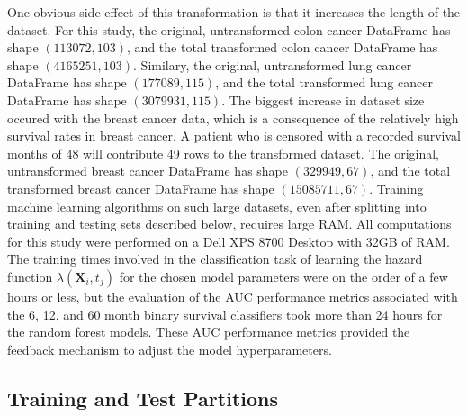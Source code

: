 \documentclass[10pt,letterpaper]{article}
\begin{document}
One obvious side effect of this transformation is that it increases the length of the dataset.
For this study, the original, untransformed colon cancer DataFrame has shape $(113072, 103)$, and the total transformed colon cancer DataFrame has shape $(4165251, 103)$.
Similary, the original, untransformed lung cancer DataFrame has shape $(177089, 115)$, and the total transformed lung cancer DataFrame has shape $(3079931, 115)$.
The biggest increase in dataset size occured with the breast cancer data, which is a consequence of the relatively high survival rates in breast cancer. A patient who is censored with a recorded survival months of 48 will contribute 49 rows to the transformed dataset.  
The original, untransformed breast cancer DataFrame has shape $(329949, 67)$, and the total transformed breast cancer DataFrame has shape $(15085711, 67)$.
Training machine learning algorithms on such large datasets, even after splitting into training and testing sets described below, requires large RAM. All computations for this study were performed on a Dell XPS 8700 Desktop with 32GB of RAM. The training times involved in the classification task of learning the hazard function $\lambda(\mathbf{X}_{i}, t_{j})$ for the chosen model parameters were on the order of a few hours or less, but the evaluation of the AUC performance metrics associated with the 6, 12, and 60 month binary survival classifiers
 took more than 24 hours for the random forest models. These AUC performance metrics provided the feedback mechanism to adjust the model hyperparameters.
\subsection{Training and Test Partitions}
\label{subsec:traintest}
\end{document}
